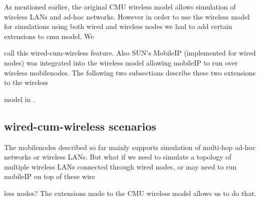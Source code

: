 {As mentioned earlier, the original CMU wireless model allows simulation of wireless LANs and ad-hoc networks. However in order to use the wireless model for simulations using both wired and wireless nodes we had to add certain extensions to cmu model. We 





















call this wired-cum-wireless feature. Also SUN's MobileIP (implemented for wired nodes) was integrated into the wireless model allowing mobileIP to run over wireless mobilenodes. The following two subsections describe these two extensions to the wireless 





















model in \ns. 


\subsection{wired-cum-wireless scenarios}
\label{sec:wired-cum-wireless}

The mobilenodes described so far mainly supports simulation of multi-hop ad-hoc networks or wireless LANs. But what if we need to simulate a topology of multiple wireless LANs connected through wired nodes, or may need to run mobileIP on top of these wire





















less nodes? The extensions made to the CMU wireless model allows us to do that.

}
